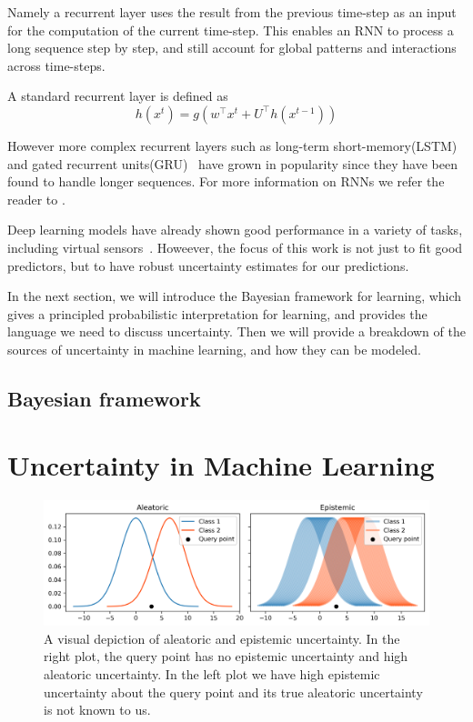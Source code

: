 \documentclass[../main.tex]{subfiles}
\begin{document}
Namely a recurrent layer uses the result from the previous time-step as an input for the computation of the current time-step. This enables an RNN to process a long sequence step by step, and still account for global patterns and interactions across time-steps. 

A standard recurrent layer is defined as~\citep{pascanu2013construct}
$$
        h(x^t) = g(w^\top x^t + U^\top h(x^{t-1}))
$$

However more complex recurrent layers such as long-term short-memory(LSTM)~\citep{hochreiter1997long} and gated recurrent units(GRU)~\citep{cho2014learning} have grown in popularity since they have been found to handle longer sequences. For more information on RNNs we refer the reader to \cite[chapter~10]{goodfellow2016deep}.

Deep learning models have already shown good performance in a variety of tasks, including virtual sensors~\citep{graber2018hybrid, alonso2019virtual, escobedo2016neural, iwashita2019tu}.
Howeever, the focus of this work is not just to fit good predictors, but to have robust uncertainty estimates for our predictions.

In the next section, we will introduce the Bayesian framework for learning, which gives a principled probabilistic interpretation for learning, and provides the language we need to discuss uncertainty. Then we will provide a breakdown of the sources of uncertainty in machine learning, and how they can be modeled.  

\subsection{Bayesian framework}



\section{Uncertainty in Machine Learning}

\begin{figure}
    \centering
    \includegraphics[width=1\textwidth]{Background/aleatoric_epistemic.png}
    \caption[Aleatoric vs. epistemic uncertainty]{A visual depiction of aleatoric and epistemic uncertainty. In the right plot, the query point has no epistemic uncertainty and high aleatoric uncertainty. In the left plot we have high epistemic uncertainty about the query point and its true aleatoric uncertainty is not known to us.}
    \label{fig:aleatoric_vs_epistemic}
\end{figure}
\end{document}
